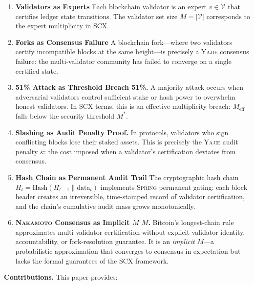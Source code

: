 \documentclass[11pt,a4paper]{article}
\theoremstyle{definition}
\newcommand{\Yajie}{\textsc{Yajie}}
\newcommand{\Spring}{\textsc{Spring}}
\newcommand{\SCX}{\textsc{SCX}}
\newcommand{\validatorSet}{\mathcal{V}}
\newcommand{\mthreshold}{M^{*}}
\newcommand{\Nakamoto}{\textsc{Nakamoto}}
\newcommand{\PoS}{\mathrm{PoS}}
\begin{document}
\begin{enumerate}[label=(\roman*)]
    \item \textbf{Validators as Experts} Each blockchain validator is an expert $v \in \validatorSet$ that certifies ledger state transitions. The validator set size $M = |\validatorSet|$ corresponds to the expert multiplicity in \SCX{}.
    \item \textbf{Forks as Consensus Failure} A blockchain fork—where two validators certify incompatible blocks at the same height—is precisely a \Yajie{} consensus failure: the multi-validator community has failed to converge on a single certified state.
    \item \textbf{51\% Attack as Threshold Breach 51\%.} A majority attack occurs when adversarial validators control sufficient stake or hash power to overwhelm honest validators. In \SCX{} terms, this is an effective multiplicity breach: $M_{\mathrm{eff}}$ falls below the security threshold $\mthreshold$.
    \item \textbf{\PoS{} Slashing as Audit Penalty Proof.} In \PoS{} protocols, validators who sign conflicting blocks lose their staked assets. This is precisely the \Yajie{} audit penalty $\kappa$: the cost imposed when a validator's certification deviates from consensus.
    \item \textbf{Hash Chain as Permanent Audit Trail} The cryptographic hash chain $H_t = \mathrm{Hash}(H_{t-1} \parallel \mathrm{data}_t)$ implements \Spring{} permanent gating: each block header creates an irreversible, time-stamped record of validator certification, and the chain's cumulative audit mass grows monotonically.
    \item \textbf{\Nakamoto{} Consensus as Implicit $M$ $M$.} Bitcoin's longest-chain rule approximates multi-validator certification without explicit validator identity, accountability, or fork-resolution guarantee. It is an \textit{implicit} $M$—a probabilistic approximation that converges to consensus in expectation but lacks the formal guarantees of the \SCX{} framework.
\end{enumerate}
\textbf{Contributions.} This paper provides:
\end{document}
